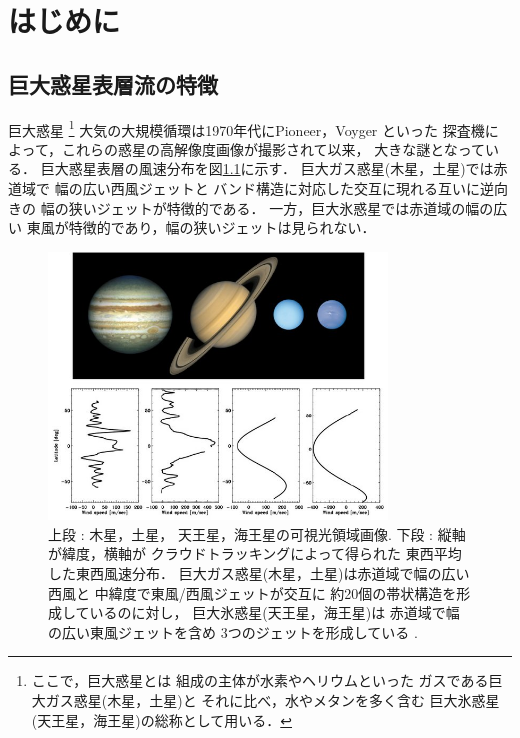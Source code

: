 \documentclass[a4j,12pt,openbib,oneside]{jreport}
\begin{document}
\clearpage
\setcounter{table}{0}
\setcounter{figure}{0}

\def\chap1{はじめに}
\chapter{\chap1}
\label{chap:1}
\markright{1 \chap1}
\def\intro1{巨大惑星表層流の特徴}
\section{\intro1}
\label{sec:intro1}
巨大惑星
%
\footnote{ここで，巨大惑星とは
組成の主体が水素やヘリウムといった
ガスである巨大ガス惑星(木星，土星)と
それに比べ，水やメタンを多く含む
巨大氷惑星(天王星，海王星)の総称として用いる．}
%
大気の大規模循環は1970年代にPioneer，Voyger といった
探査機によって，これらの惑星の高解像度画像が撮影されて以来，
大きな謎となっている．
%
巨大惑星表層の風速分布を図\ref{fig1}に示す\citep{showman2009atmospheric}．
%
巨大ガス惑星(木星，土星)では赤道域で
幅の広い西風ジェットと
バンド構造に対応した交互に現れる互いに逆向きの
幅の狭いジェットが特徴的である．
一方，巨大氷惑星では赤道域の幅の広い
東風が特徴的であり，幅の狭いジェットは見られない．
%
%
\begin{figure}[h]
  \begin{center}
    \includegraphics[clip,width=9cm]{./fig/intro/fig1.jpg}
    \caption{
      \footnotesize{上段 : 木星，土星，
天王星，海王星の可視光領域画像.
下段 : 縦軸が緯度，横軸が
クラウドトラッキングによって得られた
東西平均した東西風速分布．
巨大ガス惑星(木星，土星)は赤道域で幅の広い西風と
中緯度で東風/西風ジェットが交互に
約20個の帯状構造を形成しているのに対し，
巨大氷惑星(天王星，海王星)は
赤道域で幅の広い東風ジェットを含め
3つのジェットを形成している
\citep{showman2009atmospheric}.
      }
    }
    \label{fig1}
  \end{center}
\end{figure}
\end{document}
